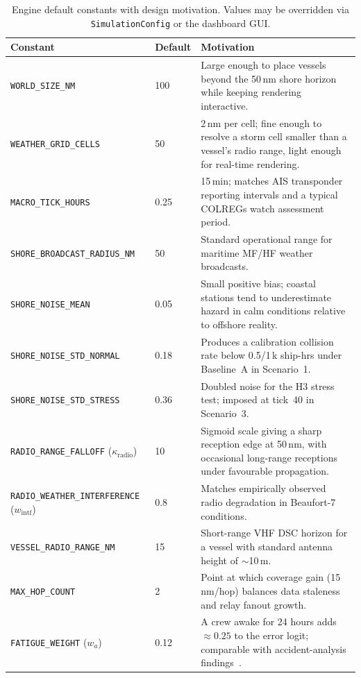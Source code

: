 \documentclass[cameraready]{Interspeech}
\begin{document}
\begin{table}[htbp]
    \caption{Engine default constants with design motivation. Values may be overridden via \texttt{SimulationConfig} or the dashboard GUI.}
    \label{tab:constants}
    \centering
    \small
    \begin{tabularx}{16cm}{@{}llX@{}}
        \toprule
        Constant & Default & Motivation \\
        \midrule
        \texttt{WORLD\_SIZE\_NM} & 100 & Large enough to place vessels beyond the 50\,nm shore horizon while keeping rendering interactive. \\
        \texttt{WEATHER\_GRID\_CELLS} & 50 & 2\,nm per cell; fine enough to resolve a storm cell smaller than a vessel's radio range, light enough for real-time rendering. \\
        \texttt{MACRO\_TICK\_HOURS} & 0.25 & 15\,min; matches AIS transponder reporting intervals and a typical COLREGs watch assessment period. \\
        \texttt{SHORE\_BROADCAST\_RADIUS\_NM} & 50 & Standard operational range for maritime MF/HF weather broadcasts. \\
        \texttt{SHORE\_NOISE\_MEAN} & 0.05 & Small positive bias; coastal stations tend to underestimate hazard in calm conditions relative to offshore reality. \\
        \texttt{SHORE\_NOISE\_STD\_NORMAL} & 0.18 & Produces a calibration collision rate below 0.5/1\,k ship-hrs under Baseline~A in Scenario~1. \\
        \texttt{SHORE\_NOISE\_STD\_STRESS} & 0.36 & Doubled noise for the H3 stress test; imposed at tick~40 in Scenario~3. \\
        \texttt{RADIO\_RANGE\_FALLOFF} ($\kappa_\text{radio}$) & 10 & Sigmoid scale giving a sharp reception edge at 50\,nm, with occasional long-range receptions under favourable propagation. \\
        \texttt{RADIO\_WEATHER\_INTERFERENCE} ($w_\text{intf}$) & 0.8 & Matches empirically observed radio degradation in Beaufort-7 conditions. \\
        \texttt{VESSEL\_RADIO\_RANGE\_NM} & 15 & Short-range VHF DSC horizon for a vessel with standard antenna height of $\sim$10\,m. \\
        \texttt{MAX\_HOP\_COUNT} & 2 & Point at which coverage gain (15\,nm/hop) balances data staleness and relay fanout growth. \\
        \texttt{FATIGUE\_WEIGHT} ($w_a$) & 0.12 & A crew awake for 24 hours adds $\approx 0.25$ to the error logit; comparable with accident-analysis findings~\cite{chauvin2013}. \\

\end{tabularx}
\end{table}
\end{document}

